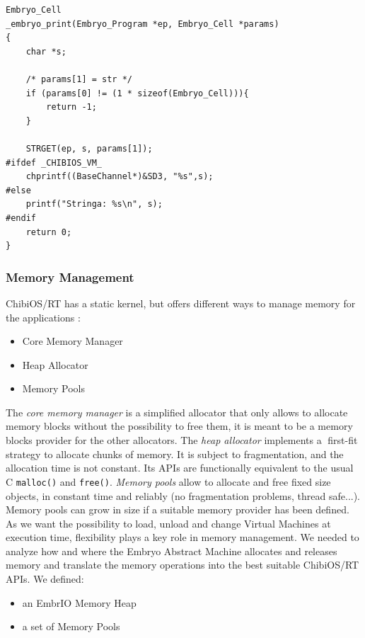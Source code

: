 \documentclass[a4paper,10pt]{article}
\begin{document}
\begin{multicols}{2}
\begin{lstlisting}[caption={Native function \textit{print}}]
Embryo_Cell
_embryo_print(Embryo_Program *ep, Embryo_Cell *params)
{
	char *s;

	/* params[1] = str */
	if (params[0] != (1 * sizeof(Embryo_Cell))){
		return -1;
	}

	STRGET(ep, s, params[1]);
#ifdef _CHIBIOS_VM_
	chprintf((BaseChannel*)&SD3, "%s",s);
#else
	printf("Stringa: %s\n", s);
#endif
	return 0;
}
\end{lstlisting}

\subsubsection{Memory Management}
\label{sec:mm}
ChibiOS/RT has a static kernel, but offers different ways to manage memory for the applications \cite{chMem}:

\begin{itemize}
\item Core Memory Manager
\item Heap Allocator
\item Memory Pools
\end{itemize}

The \textit{core memory manager} is a simplified allocator that only allows to allocate memory blocks without the possibility to free them, it is meant to be a memory blocks provider for the other allocators.\newline
The \textit{heap allocator} implements a first-fit strategy to allocate chunks of memory. It is subject to fragmentation, and the allocation time is not constant. Its APIs are functionally equivalent to the usual C \texttt{malloc()} and \texttt{free()}.\newline
\textit{Memory pools} allow to allocate and free fixed size objects, in constant time and reliably (no fragmentation problems, thread safe...). Memory pools can grow in size if a suitable memory provider has been defined.
As we want the possibility to load, unload and change Virtual Machines at execution time, flexibility plays a key role in memory management. We needed to analyze how and where the Embryo Abstract Machine allocates and releases memory and translate the memory operations into the best suitable ChibiOS/RT APIs.\newline
\bigskip
We defined:

\begin{itemize}
\item an EmbrIO Memory Heap
\item a set of Memory Pools
\end{itemize}


\end{multicols}
\end{document}
